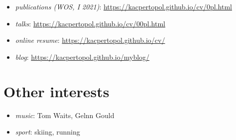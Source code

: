 \documentclass{article}
\providecommand{\tightlist}{%
  \setlength{\itemsep}{0pt}\setlength{\parskip}{0pt}}
\begin{document}
\begin{itemize}
\tightlist
\item
  \emph{publications (WOS, I 2021)}:
  \url{https://kacpertopol.github.io/cv/0pl.html}
\item
  \emph{talks}: \url{https://kacpertopol.github.io/cv/00pl.html}
\item
  \emph{online resume}: \url{https://kacpertopol.github.io/cv/}
\item
  \emph{blog}: \url{https://kacpertopol.github.io/myblog/}
\end{itemize}

\hypertarget{other-interests}{%
\section{Other interests}\label{other-interests}}

\begin{itemize}
\tightlist
\item
  \emph{music}: Tom Waits, Gelnn Gould
\item
  \emph{sport}: skiing, running
\end{itemize}
\end{document}
